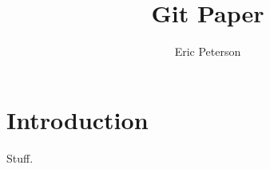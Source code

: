 \documentclass[12pt]{article}
\author{Eric Peterson} \title{Git Paper}
\begin{document}
\maketitle
\section{Introduction}

Stuff.
\end{document}
